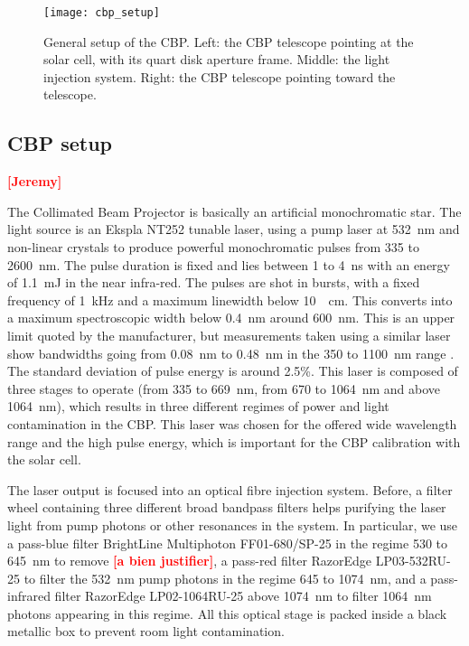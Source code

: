 \documentclass[printer]{aa}
\newcommand{\todo}[1]{\textbf{\textcolor{red}{[#1]}}\xspace}
\begin{document}
\begin{figure*}[!h]
\centering
\texttt{[image: cbp\_setup]}
\caption{General setup of the CBP. Left: the CBP telescope pointing at the solar cell, with its quart disk aperture frame. Middle: the light injection system. Right: the CBP telescope pointing toward the \SD telescope.}\label{fig:cbp_setup}
\end{figure*}

\subsection{CBP setup}


\todo{Jeremy}

The Collimated Beam Projector is basically an artificial monochromatic star. The light source is an Ekspla NT252 tunable laser, using a pump laser at \SI{532}{\nano\meter} and non-linear crystals to produce powerful monochromatic pulses from 335 to \SI{2600}{\nano\meter}. The pulse duration is fixed and lies between 1 to \SI{4}{\nano\second} with an energy of \SI{1.1}{\milli\joule} in the near infra-red. The pulses are shot in bursts, with a fixed frequency of \SI{1}{\kilo\hertz} and a maximum linewidth below \SI{10}{\per\cm}. This converts into a maximum spectroscopic width below \SI{0.4}{\nano\meter} around \SI{600}{\nano\meter}. This is an upper limit quoted by the manufacturer, but measurements taken using a similar laser show bandwidths going from \SI{0.08}{\nm} to \SI{0.48}{\nm} in the 350 to \SI{1100}{\nm} range \citep{woodward2018}. The standard deviation of pulse energy is around 2.5\%. This laser is composed of three stages to operate (from 335 to \SI{669}{\nano\meter}, from 670 to \SI{1064}{\nano\meter} and above \SI{1064}{\nano\meter}), which results in three different regimes of power and light contamination in the CBP. This laser was chosen for the offered wide wavelength range and the high pulse energy, which is important for the CBP calibration with the solar cell. 

The laser output is focused into an optical fibre injection system. Before, a filter wheel containing three different broad bandpass filters helps purifying the laser light from pump photons or other resonances in the system. In particular, we use a pass-blue filter BrightLine Multiphoton FF01-680/SP-25 in the regime 530 to \SI{645}{\nano\meter} to remove \todo{a bien justifier}, a pass-red filter RazorEdge LP03-532RU-25 to filter the \SI{532}{\nano\meter} pump photons in the regime 645 to \SI{1074}{\nano\meter}, and a pass-infrared filter RazorEdge LP02-1064RU-25 above \SI{1074}{\nano\meter} to filter \SI{1064}{\nano\meter} photons appearing in this regime. All this optical stage is packed inside a black metallic box to prevent room light contamination.
\end{document}
